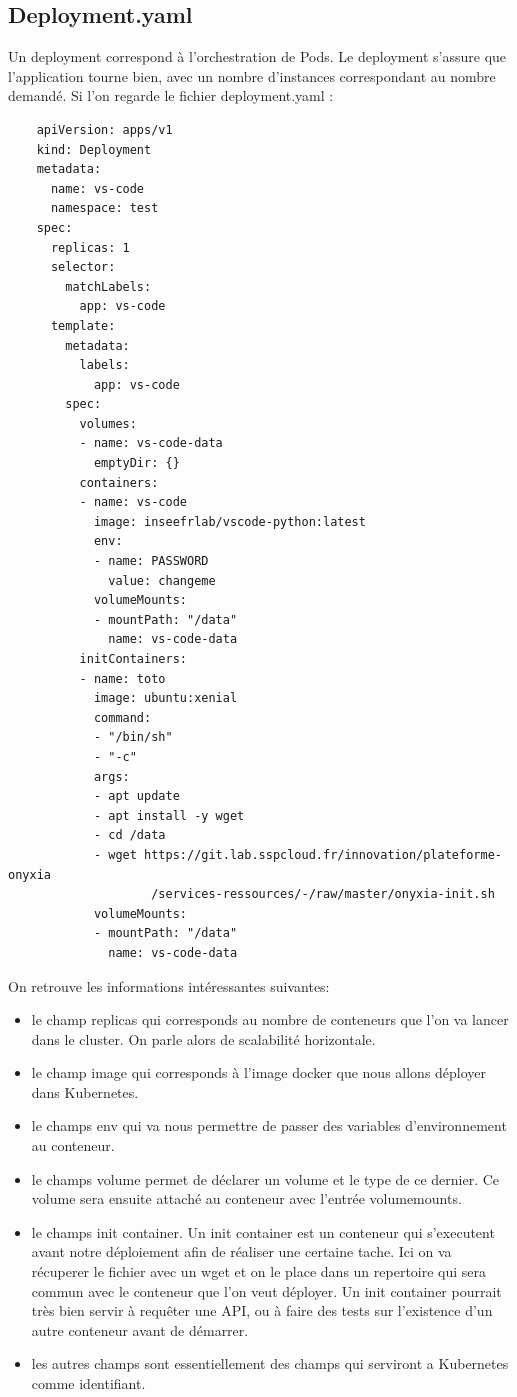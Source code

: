 \documentclass[11pt,fleqn]{book} %
\begin{document}
\subsection*{Deployment.yaml}
Un deployment correspond à l'orchestration de Pods. Le deployment s'assure que l'application tourne bien, avec un nombre d'instances correspondant au nombre demandé. Si l'on regarde le fichier deployment.yaml : 
\begin{verbatim}
    apiVersion: apps/v1
    kind: Deployment
    metadata:
      name: vs-code
      namespace: test
    spec:
      replicas: 1
      selector:
        matchLabels:
          app: vs-code
      template:
        metadata:
          labels:
            app: vs-code
        spec:
          volumes:
          - name: vs-code-data
            emptyDir: {}
          containers:
          - name: vs-code
            image: inseefrlab/vscode-python:latest
            env:
            - name: PASSWORD
              value: changeme
            volumeMounts:
            - mountPath: "/data"
              name: vs-code-data
          initContainers:
          - name: toto
            image: ubuntu:xenial
            command:
            - "/bin/sh"
            - "-c"
            args:
            - apt update
            - apt install -y wget
            - cd /data
            - wget https://git.lab.sspcloud.fr/innovation/plateforme-onyxia
                    /services-ressources/-/raw/master/onyxia-init.sh
            volumeMounts:
            - mountPath: "/data"
              name: vs-code-data
\end{verbatim}

On retrouve les informations intéressantes suivantes: 
\begin{itemize}
    \item le champ replicas qui corresponds au nombre de conteneurs que l'on va lancer dans le cluster. On parle alors de scalabilité horizontale. 
    \item le champ image qui corresponds à l'image docker que nous allons déployer dans Kubernetes.
    \item le champs env qui va nous permettre de passer des variables d'environnement au conteneur.
    \item le champs volume permet de déclarer un volume et le type de ce dernier. Ce volume sera ensuite attaché au conteneur avec l'entrée volumemounts.
    \item le champs init container. Un init container est un conteneur qui s'executent avant notre déploiement afin de réaliser une certaine tache. Ici on va récuperer le fichier avec un wget et on le place dans un repertoire qui sera commun avec le conteneur que l'on veut déployer. Un init container pourrait très bien servir à requêter une API, ou à faire des tests sur l'existence d'un autre conteneur avant de démarrer.
    \item les autres champs sont essentiellement des champs qui serviront a Kubernetes comme identifiant.\\
\end{itemize}
\end{document}
